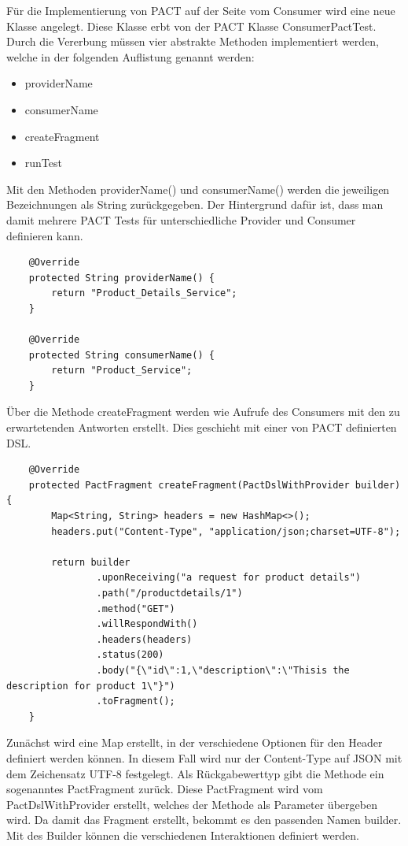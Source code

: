 \documentclass{llncs}
\begin{document}
Für die Implementierung von PACT auf der Seite vom Consumer wird eine neue Klasse angelegt. Diese Klasse erbt von der PACT Klasse ConsumerPactTest. Durch die Vererbung müssen vier abstrakte Methoden implementiert werden, welche in der folgenden Auflistung genannt werden:
\begin{itemize}
\item providerName
\item consumerName
\item createFragment
\item runTest
\end{itemize}


Mit den Methoden providerName() und consumerName() werden die jeweiligen Bezeichnungen als String zurückgegeben. Der Hintergrund dafür ist, dass man damit mehrere PACT Tests für unterschiedliche Provider und Consumer definieren kann.
\lstset{language = Java}
\begin{lstlisting}
    @Override
    protected String providerName() {
        return "Product_Details_Service";
    }

    @Override
    protected String consumerName() {
        return "Product_Service";
    }
\end{lstlisting}

Über die Methode createFragment werden wie Aufrufe des Consumers mit den zu erwartetenden Antworten erstellt. Dies geschieht mit einer von PACT definierten DSL.
\lstset{language = Java}
\begin{lstlisting}
    @Override
    protected PactFragment createFragment(PactDslWithProvider builder) {
        Map<String, String> headers = new HashMap<>();
        headers.put("Content-Type", "application/json;charset=UTF-8");
        
        return builder
        		.uponReceiving("a request for product details")
                .path("/productdetails/1")
                .method("GET")
                .willRespondWith()
                .headers(headers)
                .status(200)
                .body("{\"id\":1,\"description\":\"Thisis the description for product 1\"}")
                .toFragment();
    }
\end{lstlisting}
Zunächst wird eine Map erstellt, in der verschiedene Optionen für den Header definiert werden können. In diesem Fall wird nur der  Content-Type auf JSON mit dem Zeichensatz UTF-8 festgelegt. Als Rückgabewerttyp gibt die Methode ein sogenanntes PactFragment zurück. Diese PactFragment wird vom PactDslWithProvider erstellt, welches der Methode als Parameter übergeben wird. Da damit das Fragment erstellt, bekommt es den passenden Namen builder. Mit des Builder können die verschiedenen Interaktionen definiert werden.
\end{document}
